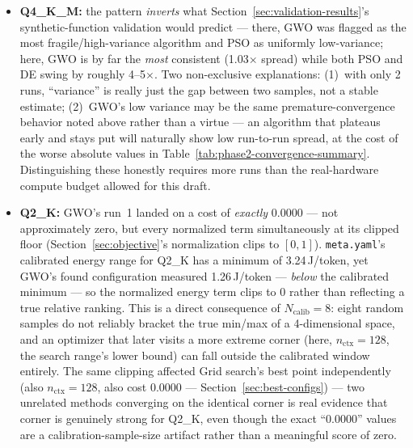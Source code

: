 \documentclass[journal]{IEEEtran}
\begin{document}
\begin{itemize}
  \item \textbf{Q4\_K\_M:} the pattern \emph{inverts} what Section~\ref{sec:validation-results}'s synthetic-function validation would predict --- there, GWO was flagged as the most fragile/high-variance algorithm and PSO as uniformly low-variance; here, GWO is by far the \emph{most} consistent (1.03$\times$ spread) while both PSO and DE swing by roughly 4--5$\times$. Two non-exclusive explanations: (1)~with only 2 runs, ``variance'' is really just the gap between two samples, not a stable estimate; (2)~GWO's low variance may be the same premature-convergence behavior noted above rather than a virtue --- an algorithm that plateaus early and stays put will naturally show low run-to-run spread, at the cost of the worse absolute values in Table~\ref{tab:phase2-convergence-summary}. Distinguishing these honestly requires more runs than the real-hardware compute budget allowed for this draft.
  \item \textbf{Q2\_K:} GWO's run~1 landed on a cost of \emph{exactly} 0.0000 --- not approximately zero, but every normalized term simultaneously at its clipped floor (Section~\ref{sec:objective}'s normalization clips to $[0,1]$). \texttt{meta.yaml}'s calibrated energy range for Q2\_K has a minimum of 3.24\,J/token, yet GWO's found configuration measured 1.26\,J/token --- \emph{below} the calibrated minimum --- so the normalized energy term clips to 0 rather than reflecting a true relative ranking. This is a direct consequence of $N_{\text{calib}}=8$: eight random samples do not reliably bracket the true min/max of a 4-dimensional space, and an optimizer that later visits a more extreme corner (here, $n_{\text{ctx}}=128$, the search range's lower bound) can fall outside the calibrated window entirely. The same clipping affected Grid search's best point independently (also $n_{\text{ctx}}=128$, also cost 0.0000 --- Section~\ref{sec:best-configs}) --- two unrelated methods converging on the identical corner is real evidence that corner is genuinely strong for Q2\_K, even though the exact ``0.0000'' values are a calibration-sample-size artifact rather than a meaningful score of zero.

\end{itemize}
\end{document}
